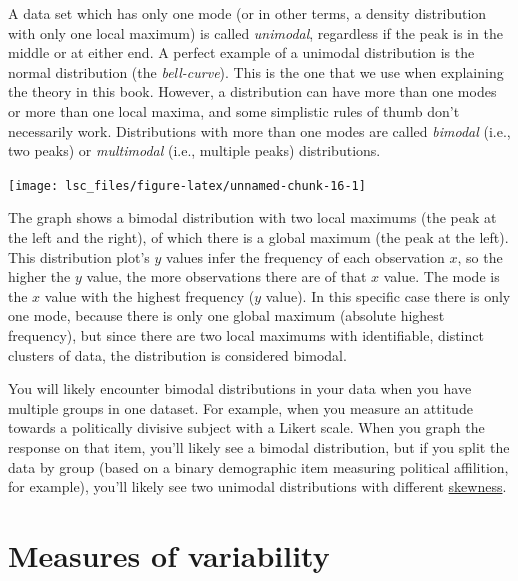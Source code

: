 \documentclass[
  11pt,
  a4paper,
  twoside,symmetric,openright]{book}
\theoremstyle{break}
\theoremstyle{break}
\begin{document}
\label{calloutmultimodal}
\begin{callout}

A data set which has only one mode (or in other terms, a density distribution with only one local maximum) is called \emph{unimodal}, regardless if the peak is in the middle or at either end. A perfect example of a unimodal distribution is the normal distribution (the \emph{bell-curve}). This is the one that we use when explaining the theory in this book. However, a distribution can have more than one modes or more than one local maxima, and some simplistic rules of thumb don't necessarily work. Distributions with more than one modes are called \emph{bimodal} (i.e., two peaks) or \emph{multimodal} (i.e., multiple peaks) distributions.

\begin{center}\texttt{[image: lsc\_files/figure-latex/unnamed-chunk-16-1]} \end{center}

The graph shows a bimodal distribution with two local maximums (the peak at the left and the right), of which there is a global maximum (the peak at the left). This distribution plot's \(y\) values infer the frequency of each observation \(x\), so the higher the \(y\) value, the more observations there are of that \(x\) value. The mode is the \(x\) value with the highest frequency (\(y\) value). In this specific case there is only one mode, because there is only one global maximum (absolute highest frequency), but since there are two local maximums with identifiable, distinct clusters of data, the distribution is considered bimodal.

You will likely encounter bimodal distributions in your data when you have multiple groups in one dataset. For example, when you measure an attitude towards a politically divisive subject with a Likert scale. When you graph the response on that item, you'll likely see a bimodal distribution, but if you split the data by group (based on a binary demographic item measuring political affilition, for example), you'll likely see two unimodal distributions with different \hyperref[skewnesskurtosis]{skewness}.

\end{callout}

\section{Measures of variability}\label{var}
\end{document}
